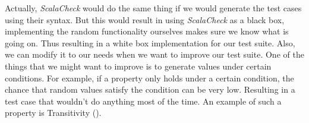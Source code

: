 Actually, \textit{ScalaCheck} would do the same thing if we would generate the test cases using their syntax. But this would result in using \textit{ScalaCheck} as a black box, implementing the random functionality ourselves makes sure we know what is going on. Thus resulting in a white box implementation for our test suite. Also, we can modify it to our needs when we want to improve our test suite. One of the things that we might want to improve is to generate values under certain conditions. For example, if a property only holds under a certain condition, the chance that random values satisfy the condition can be very low. Resulting in a test case that wouldn't do anything most of the time. An example of such a property is Transitivity ().%


